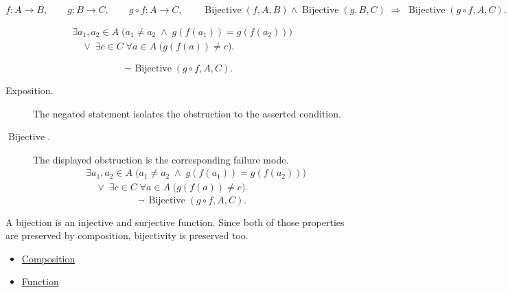 \begin{remark*}
\[
  f\colon A\to B,\qquad
  g\colon B\to C,\qquad
  g\circ f\colon A\to C,\qquad
  \operatorname{Bijective}(f,A,B)\wedge\operatorname{Bijective}(g,B,C)
  \;\Longrightarrow\;
  \operatorname{Bijective}(g\circ f,A,C).
\]
\end{remark*}

\begin{remark*}
\[
\begin{aligned}
&\exists a_1,a_2\in A\;\bigl(a_1\neq a_2\;\wedge\;g(f(a_1))=g(f(a_2))\bigr) \\
&\quad\vee\;
  \exists c\in C\;\forall a\in A\;\bigl(g(f(a))\neq c\bigr).
\end{aligned}
\]
\end{remark*}

\begin{remark*}
\[
  \neg\,\operatorname{Bijective}(g\circ f,A,C).
\]
\end{remark*}

\begin{remark*}
\begin{description}
  \item[Exposition.]
  The negated statement isolates the obstruction to the asserted condition.

  \item[\(\operatorname{Bijective}.\)]
  The displayed obstruction is the corresponding failure mode.
  \[
\begin{aligned}
&\exists a_1,a_2\in A\;\bigl(a_1\neq a_2\;\wedge\;g(f(a_1))=g(f(a_2))\bigr) \\
&\quad\vee\;
  \exists c\in C\;\forall a\in A\;\bigl(g(f(a))\neq c\bigr).
\end{aligned}
\]
  \[
  \neg\,\operatorname{Bijective}(g\circ f,A,C).
\]
\end{description}
\end{remark*}



\begin{remark*}[Interpretation]
A bijection is an injective and surjective function. Since both of those
properties are preserved by composition, bijectivity is preserved too.
\end{remark*}

\begin{dependencies}
\begin{itemize}
  \item \hyperref[def:composition]{Composition}
  \item \hyperref[def:function]{Function}
\end{itemize}
\end{dependencies}

